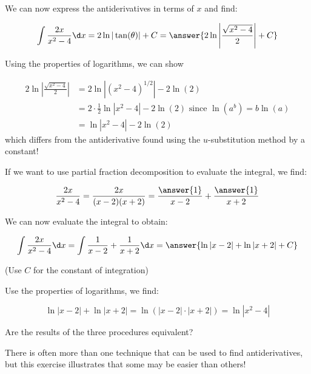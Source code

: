 \documentclass{ximera}
\begin{document}
\begin{exercise}
\begin{exercise}
\begin{exercise}
\begin{exercise}
\begin{exercise}
We can now express the antiderivatives in terms of $x$ and find:

\[
\int \frac{2x}{x^2-4} \d x =  2 \ln|\tan(\theta)|+C = \answer{2 \ln \left| \frac{\sqrt{x^2-4}}{2} \right| +C}
\]

\begin{exercise}
Using the properties of logarithms, we can show

\begin{align*}
2 \ln \left| \frac{ \sqrt{x^2-4} }{2} \right| & = 2 \ln \left|(x^2-4)^{1/2} \right| - 2 \ln(2) \\
& = 2 \cdot \frac{1}{2} \ln \left| x^2-4 \right| - 2 \ln(2) \textrm{ since } \ln\left(a^b\right) = b \ln(a) \\
& =  \ln \left|x^2-4 \right| - 2 \ln(2)
\end{align*}
which differs from the antiderivative found using the $u$-substitution method by a constant!

\end{exercise}
\end{exercise}
\end{exercise}
\end{exercise}
\end{exercise}


If we want to use partial fraction decomposition to evaluate the integral, we find:

\[
\frac{2x}{x^2-4} = \frac{2x}{(x-2)(x+2)} = \frac{\answer{1}}{x-2}+\frac{\answer{1}}{x+2}
\]
\begin{exercise}
We can now evaluate the integral to obtain:

\[
\int \frac{2x}{x^2-4} \d x = \int \frac{1}{x-2}+\frac{1}{x+2} \d x = \answer{\ln|x-2| + \ln|x+2|+C}
\]
 
(Use $C$ for the constant of integration)

\begin{exercise}
Use the properties of logarithms, we find:

\[ \ln|x-2| + \ln|x+2| = \ln \left( |x-2| \cdot |x+2|  \right) = \ln \left| x^2-4  \right| \]
\end{exercise}
\end{exercise}

\begin{exercise}
Are the results of the three procedures equivalent?
\begin{multipleChoice}
\end{multipleChoice}
There is often more than one technique that can be used to find antiderivatives, but this exercise illustrates that some may be easier than others!
\end{exercise}
\end{exercise}
\end{document}
